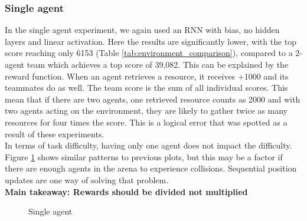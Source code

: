\documentclass[12pt]{article}
\begin{document}
\subsubsection{Single agent}

In the single agent experiment, we again used an RNN with bias, no hidden layers and linear activation. Here the results are significantly lower, with the top score reaching only 6153 (Table \ref{tab:environment_comparison}), compared to a 2-agent team which achieves a top score of 39,082. This can be explained by the reward function. When an agent retrieves a resource, it receives +1000 and its teammates do as well. The team score is the sum of all individual scores. This mean that if there are two agents, one retrieved resource counts as 2000 and with two agents acting on the environment, they are likely to gather twice as many resources for four times the score. This is a logical error that was spotted as a result of these experiments.\\

In terms of task difficulty, having only one agent does not impact the difficulty. Figure \ref{fig:single_agent} shows similar patterns to previous plots, but this may be a factor if there are enough agents in the arena to experience collisions. Sequential position updates are one way of solving that problem.\\

\textbf{Main takeaway: Rewards should be divided not multiplied}

\begin{figure}[!tbp]
  \centering
  \hfill
  \hfill
  
  \caption{Single agent}
  \label{fig:single_agent}
\end{figure}
\end{document}
